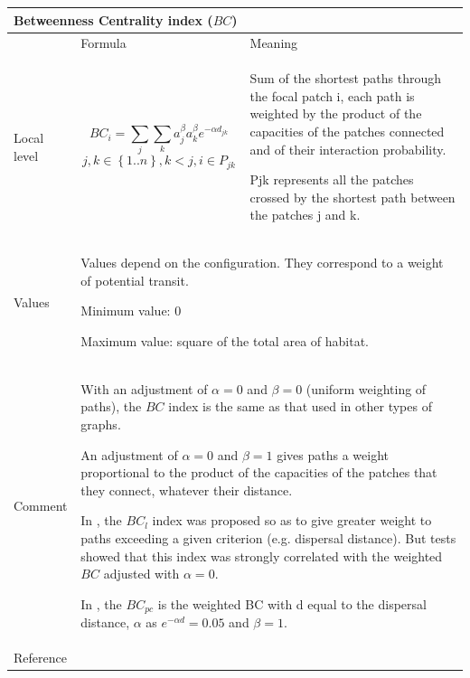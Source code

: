 \documentclass{article}
\begin{document}
\begin{table}[H]
\begin{tabular}{|m{3.24cm}|m{4.4810004cm}m{7.924cm}|}
\hline
\multicolumn{3}{|m{16.044998cm}|}{Betweenness Centrality index
($BC$)}\\\hline
 &
\multicolumn{1}{m{4.4810004cm}|}{Formula} &
Meaning\\\hline
Local level &
\multicolumn{1}{m{4.4810004cm}|}{\begin{equation*}
{\mathit{BC}}_{i}=\sum _{j}{\sum _{k}{{a}_{j}^{\beta }}}{a}_{k}^{\beta
}{e}^{-\alpha {d}_{\mathit{jk}}}
\end{equation*}
\begin{equation*}
j,k{\in}\left\{1..n\right\},k<j,i{\in}{P}_{\mathit{jk}}
\end{equation*}
} &
Sum of the shortest paths through the focal patch i, each path is
weighted by the product of the capacities of the patches connected and
of their interaction probability.

Pjk represents all the patches crossed by the shortest path between the
patches j and k.

\\\hline
Values &
\multicolumn{2}{m{12.6050005cm}|}{Values depend on the configuration.
They correspond to a weight of potential transit.

Minimum value: 0

Maximum value: square of the total area of habitat.
}\\\hline
Comment &
\multicolumn{2}{m{12.6050005cm}|}{With an adjustment of $\alpha = 0$
and $\beta = 0$ (uniform weighting of paths), the $BC$ index is the same
as that used in other types of graphs. 

An adjustment of $\alpha = 0$ and $\beta = 1$ gives paths a weight
proportional to the product of the capacities of the patches that they
connect, whatever their distance. 

In \cite{2012_graphab_EMS, 2012_SDM}, the $BC_l$ index was proposed so as to
give greater weight to paths exceeding a given criterion (e.g.
dispersal distance). But tests showed that this index was strongly
correlated with the weighted $BC$ adjusted with $\alpha=0$. 

In \cite{Bodin2010}, the  ${\mathit{BC}}_{\mathit{pc}}$ is the
weighted BC with d equal to the dispersal distance,  $\alpha $ as 
${e}^{-\mathit{\alpha d}}=0.05$ and  $\beta =1$.

}\\\hline
Reference &
\multicolumn{2}{m{12.6050005cm}|}{
\cite{Bodin2010}
\cite{2012_graphab_EMS}	
}\\\hline
\end{tabular}
\end{table}
\end{document}
